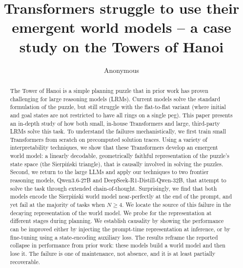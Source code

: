 \documentclass{article} %
\title{Transformers struggle to use their emergent world models -- a case study on the Towers of Hanoi}
\author{Anonymous}
\begin{document}
\ifcolmsubmission
\linenumbers
\fi

\maketitle

\begin{abstract}

The Tower of Hanoi is a simple planning puzzle that in prior work has proven challenging for large reasoning models (LRMs). Current models solve the standard formulation of the puzzle, but still struggle with the flat-to-flat variant (where initial and goal states are not restricted to have all rings on a single peg). 
This paper presents an in-depth study of how both small, in-house
Transformers and large, third-party LRMs solve this %
task. %
%
To understand the
failures mechanistically, we first train small Transformers from
scratch on precomputed solution traces. Using a variety of
interpretability techniques, we show that these Transformers develop
an emergent world model: a linearly decodable, geometrically faithful
representation of the puzzle's state space (the Sierpi\'nski
triangle), that is causally involved in solving the puzzles. 
%
Second, we return to the large LLMs and apply our techniques to two frontier reasoning models,
Qwen3.6-27B and DeepSeek-R1-Distill-Qwen-32B, that attempt to solve
the task through extended chain-of-thought.  Surprisingly, we find
that both models encode the Sierpi\'nski world model near-perfectly at
the end of the prompt, and yet fail at the majority of tasks when
$N\geq4$. We locate the source of this failure in the decaying
representation of the world model. We probe for the representation at
different stages during planning. We establish causality by showing the performance can be improved either by injecting the prompt-time representation at inference, or by fine-tuning using a state-encoding
auxiliary loss. The results reframe the reported collapse in performance from prior work: these
models build a world model and then lose it. The failure is one of
maintenance, not absence, and it is at least partially recoverable.
\end{abstract}
\end{document}
